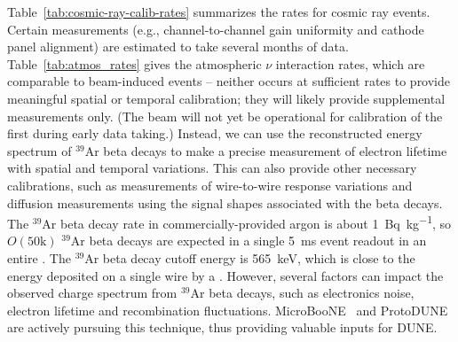 Table~\ref{tab:cosmic-ray-calib-rates} summarizes the rates for cosmic ray events. Certain measurements (e.g., channel-to-channel gain uniformity and cathode panel alignment) are estimated to take several months of data. Table~\ref{tab:atmos_rates} gives the atmospheric $\nu$ interaction rates, which  
 are comparable to beam-induced events -- neither occurs at sufficient rates to provide meaningful spatial or temporal calibration; they will likely provide supplemental measurements only. (The beam will not yet be operational for calibration of the first  during early data taking.) Instead, we can use the reconstructed energy spectrum of ${}^{39}$Ar beta decays to make a precise measurement of electron lifetime with spatial and temporal variations. 
 This can also provide other necessary calibrations, such as measurements of wire-to-wire response variations and diffusion measurements using the signal shapes associated with the beta decays. The ${}^{39}$Ar beta decay rate in commercially-provided argon is about \SI{1}{\becquerel\per\kilo\gram}, so $O(\mathrm{50k})$ ${}^{39}$Ar beta decays are expected in a single \SI{5}{\milli\s} event readout in an entire \nominalmodsize \detmodule. 
 The ${}^{39}$Ar beta decay cutoff energy is \SI{565}{\keV},  which is close to the energy deposited on a single wire by a . However, several factors can impact the observed charge spectrum from ${}^{39}$Ar beta decays, such as electronics noise, electron lifetime and recombination fluctuations. MicroBooNE~\cite{MICROBOONE-NOTE-1050-PUB} and ProtoDUNE are actively pursuing this technique, thus providing valuable inputs for DUNE.

